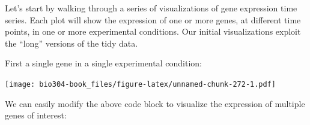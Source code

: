 \documentclass[]{book}
\newenvironment{Shaded}{\begin{snugshade}}{\end{snugshade}}
\newcommand{\CharTok}[1]{\textcolor[rgb]{0.31,0.60,0.02}{#1}}
\newcommand{\DataTypeTok}[1]{\textcolor[rgb]{0.13,0.29,0.53}{#1}}
\newcommand{\KeywordTok}[1]{\textcolor[rgb]{0.13,0.29,0.53}{\textbf{#1}}}
\newcommand{\NormalTok}[1]{#1}
\newcommand{\OperatorTok}[1]{\textcolor[rgb]{0.81,0.36,0.00}{\textbf{#1}}}
\newcommand{\StringTok}[1]{\textcolor[rgb]{0.31,0.60,0.02}{#1}}
\theoremstyle{definition}
\theoremstyle{definition}
\theoremstyle{definition}
\theoremstyle{remark}
\begin{document}
Let's start by walking through a series of visualizations of gene
expression time series. Each plot will show the expression of one or
more genes, at different time points, in one or more experimental
conditions. Our initial visualizations exploit the ``long'' versions of
the tidy data.

First a single gene in a single experimental condition:

\begin{Shaded}
\end{Shaded}

\texttt{[image: bio304-book\_files/figure-latex/unnamed-chunk-272-1.pdf]}

We can easily modify the above code block to visualize the expression of
multiple genes of interest:

\begin{Shaded}
\end{Shaded}
\end{document}
